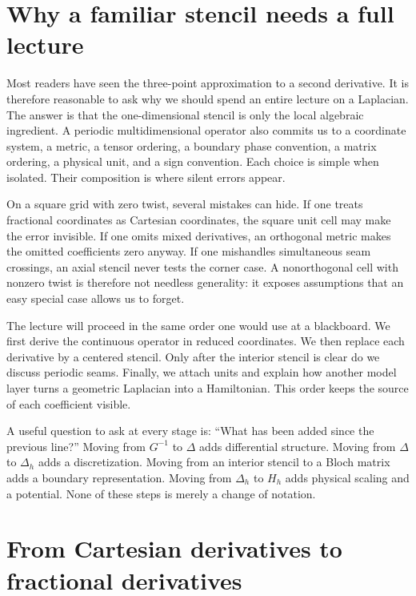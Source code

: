 \section{Why a familiar stencil needs a full lecture}

Most readers have seen the three-point approximation to a second derivative.
It is therefore reasonable to ask why we should spend an entire lecture on a
Laplacian. The answer is that the one-dimensional stencil is only the local
algebraic ingredient. A periodic multidimensional operator also commits us to a
coordinate system, a metric, a tensor ordering, a boundary phase convention,
a matrix ordering, a physical unit, and a sign convention. Each choice is
simple when isolated. Their composition is where silent errors appear.

On a square grid with zero twist, several mistakes can hide. If one treats
fractional coordinates as Cartesian coordinates, the square unit cell may make
the error invisible. If one omits mixed derivatives, an orthogonal metric makes
the omitted coefficients zero anyway. If one mishandles simultaneous seam
crossings, an axial stencil never tests the corner case. A nonorthogonal cell
with nonzero twist is therefore not needless generality: it exposes assumptions
that an easy special case allows us to forget.

The lecture will proceed in the same order one would use at a blackboard. We
first derive the continuous operator in reduced coordinates. We then replace
each derivative by a centered stencil. Only after the interior stencil is clear
do we discuss periodic seams. Finally, we attach units and explain how another
model layer turns a geometric Laplacian into a Hamiltonian. This order keeps the
source of each coefficient visible.

A useful question to ask at every stage is: ``What has been added since the
previous line?'' Moving from $G^{-1}$ to $\Delta$ adds differential structure.
Moving from $\Delta$ to $\Delta_h$ adds a discretization. Moving from an
interior stencil to a Bloch matrix adds a boundary representation. Moving from
$\Delta_h$ to $H_h$ adds physical scaling and a potential. None of these steps
is merely a change of notation.

\section{From Cartesian derivatives to fractional derivatives}


